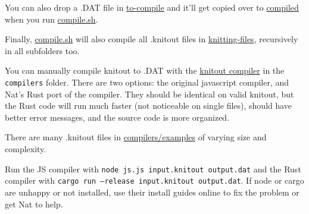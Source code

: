 \documentclass[acmsmall,screen,review,anonymous,nonacm]{acmart}
\begin{document}
You can also drop a .DAT file in \href{../to-compile}{to-compile} and it'll get copied
over to \href{../compiled}{compiled} when you run \href{../compile.sh}{compile.sh}.

Finally, \href{../compile.sh}{compile.sh} will also compile all .knitout files in
\href{../knitting-files}{knitting-files}, recursively in all subfolders too.

You can manually compile knitout to .DAT with the \href{../compilers/js.js}{knitout compiler}
in the \texttt{compilers} folder. There are two options: the original javascript compiler, and Nat's Rust port of the
compiler. They should be identical on valid knitout, but the Rust code will run much faster (not noticeable on single
files), should have better error messages, and the source code is more organized.

There are many .knitout files in \href{../compilers/examples}{compilers/examples} of varying size and complexity.

Run the JS compiler with \texttt{node js.js input.knitout output.dat} and the Rust compiler with \texttt{cargo run --release input.knitout output.dat}.
If node or cargo are unhappy or not installed, use their install guides online to fix the problem or get Nat to help.
\end{document}
